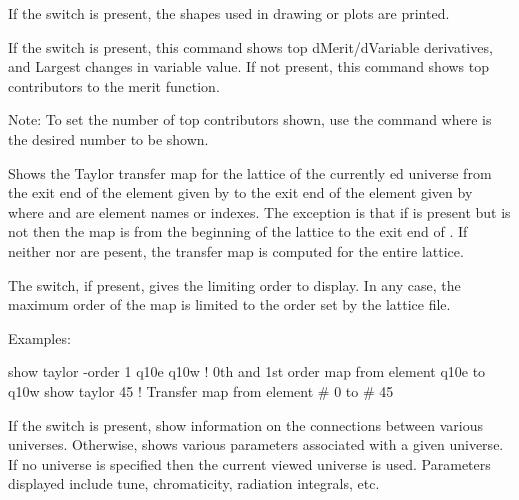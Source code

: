 {{{\begin{description}
If the  switch is present, the shapes used in drawing 
 or  plots are printed.


\item[show top10 \{-derivative\}] \Newline
If the  switch is present, this command shows top
dMerit/dVariable derivatives, and Largest changes in variable value.
If not present, this command
shows top contributors to the merit function.

Note: To set the number of top contributors shown, use the command
 where  is the desired number to
be shown.


\item[show taylor\_map \{-order <n\_order>\} \{loc1 \{loc2\}\}] \Newline

Shows the Taylor transfer map for the  lattice of the
currently ed universe from the exit end of the element given
by  to the exit end of the element given by  where
 and  are element names or indexes. The exception is
that if  is present but  is not then the map is from
the beginning of the lattice to the exit end of . If neither
 nor  are pesent, the transfer map is computed for
the entire lattice.

The  switch, if present, gives the limiting order to
display. In any case, the maximum order of the map is limited to the
order set by the lattice file.

Examples:
\begin{example}
  show taylor -order 1 q10e q10w  ! 0th and 1st order map from element q10e to q10w
  show taylor 45                  ! Transfer map from element \# 0 to \# 45
\end{example} 


\item[\protect\parbox{6in}{ 
        show universe \{universe\_number\} \\
        show universe -connections}] \Newline
If the  switch is present, show information on the
connections between various universes. Otherwise, shows various
parameters associated with a given universe. If no universe is
specified then the current viewed universe is used. Parameters
displayed include tune, chromaticity, radiation integrals, etc.


\end{description}}}}
